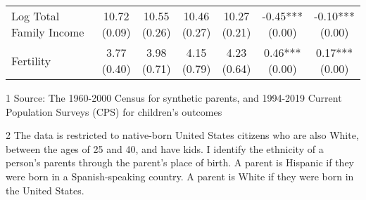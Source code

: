 \begin{table}[t]
\begin{threeparttable}
\begin{tabular}[t]{>{\raggedright\arraybackslash}p{5cm}cccccc}
Log Total Family Income & \specialcell{10.72\\(0.09)} & \specialcell{10.55\\(0.26)} & \specialcell{10.46\\(0.27)} & \specialcell{10.27\\(0.21)} & \specialcell{-0.45***\\(0.00)} & \specialcell{-0.10***\\(0.00)}\\
Fertility & \specialcell{3.77\\(0.40)} & \specialcell{3.98\\(0.71)} & \specialcell{4.15\\(0.79)} & \specialcell{4.23\\(0.64)} & \specialcell{0.46***\\(0.00)} & \specialcell{0.17***\\(0.00)}\\
\bottomrule
\end{tabular}
\begin{tablenotes}
\item[1] Source: The 1960-2000 Census for synthetic parents, and 1994-2019 Current Population Surveys (CPS) for children's outcomes
\item[2] The data is restricted to native-born United States citizens who are also White, between the ages of 25 and 40, and have kids. I identify the ethnicity of a person's parents through the parent's place of birth. A parent is Hispanic if they were born in a Spanish-speaking country. A parent is White if they were born in the United States.
\end{tablenotes}
\end{threeparttable}
\end{table}
